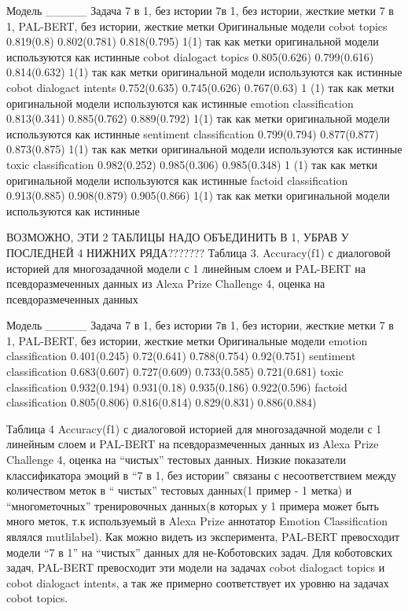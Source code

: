 Модель
_____
Задача
7 в 1, без истории
7в 1, без истории, жесткие метки
7 в 1, PAL-BERT, без истории, жесткие метки
Оригинальные модели
cobot topics
0.819(0.8)
0.802(0.781)
0.818(0.795)
1(1) так как метки оригинальной модели используются как истинные
cobot dialogact topics
0.805(0.626)
0.799(0.616)
0.814(0.632)
1(1) так как метки оригинальной модели используются как истинные
cobot dialogact intents
0.752(0.635)
0.745(0.626)
0.767(0.63)
1 (1) так как метки оригинальной модели используются как истинные
emotion classification
0.813(0.341)
0.885(0.762)
0.889(0.792)
1(1) так как метки оригинальной модели используются как истинные
sentiment classification
0.799(0.794)
0.877(0.877)
0.873(0.875)
1(1) так как метки оригинальной модели используются как истинные
toxic classification
0.982(0.252)
0.985(0.306)
0.985(0.348)
1 (1) так как метки оригинальной модели используются как истинные
factoid classification
0.913(0.885)
0.908(0.879)
0.905(0.866)
1(1) так как метки оригинальной модели используются как истинные



ВОЗМОЖНО, ЭТИ 2 ТАБЛИЦЫ НАДО ОБЪЕДИНИТЬ В 1, УБРАВ У ПОСЛЕДНЕЙ 4 НИЖНИХ РЯДА???????
Таблица 3. Accuracy(f1) с диалоговой историей для многозадачной модели с 1 линейным слоем и PAL-BERT на псевдоразмеченных данных из Alexa Prize Challenge 4, оценка на псевдоразмеченных данных



Модель
_____
Задача
7 в 1, без истории
7в 1, без истории, жесткие метки
7 в 1, PAL-BERT, без истории, жесткие метки
Оригинальные модели
emotion classification
0.401(0.245)
0.72(0.641)
0.788(0.754)
0.92(0.751)
sentiment classification
0.683(0.607)
0.727(0.609)
0.733(0.585)
0.721(0.681)
toxic classification
0.932(0.194)
0.931(0.18)
0.935(0.186)
0.922(0.596)
factoid classification
0.805(0.806)
0.816(0.814)
0.829(0.831)
0.886(0.884)

Таблица 4 Accuracy(f1) с диалоговой историей для многозадачной модели с 1 линейным слоем и PAL-BERT на псевдоразмеченных данных из Alexa Prize Challenge 4, оценка на “чистых” тестовых данных. 
Низкие показатели классификатора эмоций в “7 в 1, без истории” связаны с несоответствием между количеством меток в “ чистых” тестовых данных(1 пример - 1 метка) и “многометочных” тренировочных данных(в которых у 1 примера может быть много меток, т.к используемый в Alexa Prize аннотатор Emotion Classification являлся mutlilabel).
Как можно видеть из эксперимента, PAL-BERT превосходит модели “7 в 1” на “чистых” данных для не-Коботовских задач. Для коботовских задач, PAL-BERT превосходит эти модели на задачах cobot dialogact topics и cobot dialogact intents, а так же примерно соответствует их уровню на задачах cobot topics.


